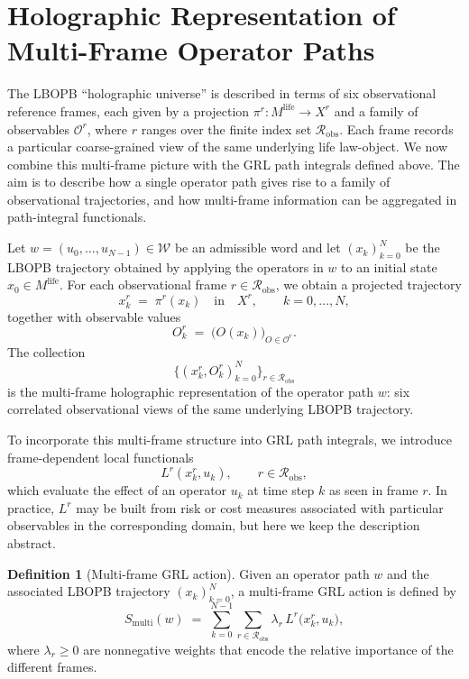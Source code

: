 \documentclass[11pt]{book}
\theoremstyle{plain}
\theoremstyle{definition}
\newtheorem{definition}[theorem]{Definition}
\theoremstyle{remark}
\begin{document}
\section{Holographic Representation of Multi-Frame Operator Paths}


The LBOPB ``holographic universe'' is described in terms of six
observational reference frames, each given by a projection
$\pi^{r} \colon M^{\mathrm{life}} \to X^{r}$ and a family of
observables $\mathcal{O}^{r}$, where $r$ ranges over the finite index
set $\mathcal{R}_{\mathrm{obs}}$. Each frame records a particular
coarse-grained view of the same underlying life law-object. We now
combine this multi-frame picture with the GRL path integrals defined
above. The aim is to describe how a single operator path gives rise to
a family of observational trajectories, and how multi-frame information
can be aggregated in path-integral functionals.

Let $w = (u_{0},\dots,u_{N-1}) \in \mathcal{W}$ be an admissible word
and let $(x_{k})_{k=0}^{N}$ be the LBOPB trajectory obtained by
applying the operators in $w$ to an initial state $x_{0} \in
M^{\mathrm{life}}$. For each observational frame
$r \in \mathcal{R}_{\mathrm{obs}}$, we obtain a projected trajectory
\[
  x^{r}_{k} \;=\; \pi^{r}(x_{k})
  \quad\text{in}\quad X^{r},
  \qquad k = 0,\dots,N,
\]
together with observable values
\[
  O^{r}_{k}
  \;=\;
  \bigl( O(x_{k}) \bigr)_{O \in \mathcal{O}^{r}}.
\]
The collection
\[
  \bigl\{ (x^{r}_{k}, O^{r}_{k})_{k=0}^{N} \bigr\}_{r \in \mathcal{R}_{\mathrm{obs}}}
\]
is the multi-frame holographic representation of the operator path $w$:
six correlated observational views of the same underlying LBOPB
trajectory.

To incorporate this multi-frame structure into GRL path integrals, we
introduce frame-dependent local functionals
\[
  L^{r}(x^{r}_{k}, u_{k}),
  \qquad r \in \mathcal{R}_{\mathrm{obs}},
\]
which evaluate the effect of an operator $u_{k}$ at time step $k$
as seen in frame $r$. In practice, $L^{r}$ may be built from risk or
cost measures associated with particular observables in the
corresponding domain, but here we keep the description abstract.

\begin{definition}[Multi-frame GRL action]
Given an operator path $w$ and the associated LBOPB trajectory
$(x_{k})_{k=0}^{N}$, a multi-frame GRL action is defined by
\[
  S_{\mathrm{multi}}(w)
  \;=\;
  \sum_{k=0}^{N-1}
  \sum_{r \in \mathcal{R}_{\mathrm{obs}}}
  \lambda_{r}\,
  L^{r}\bigl(x^{r}_{k}, u_{k}\bigr),
\]
where $\lambda_{r} \ge 0$ are nonnegative weights that encode the
relative importance of the different frames.
\end{definition}
\end{document}
